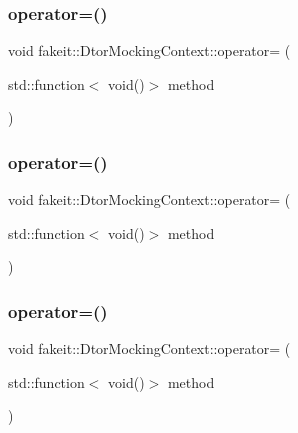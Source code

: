 \subsubsection{\texorpdfstring{operator=()}{operator=()}\hspace{0.1cm}{\footnotesize\ttfamily [3/9]}}
{\footnotesize\ttfamily void fakeit\+::\+Dtor\+Mocking\+Context\+::operator= (\begin{DoxyParamCaption}\item[{std\+::function$<$ void()$>$}]{method }\end{DoxyParamCaption})\hspace{0.3cm}{\ttfamily [inline]}}

\mbox{\label{classfakeit_1_1DtorMockingContext_ac65118e0817e56484fb2238d6c1b3f46}} 
\subsubsection{\texorpdfstring{operator=()}{operator=()}\hspace{0.1cm}{\footnotesize\ttfamily [4/9]}}
{\footnotesize\ttfamily void fakeit\+::\+Dtor\+Mocking\+Context\+::operator= (\begin{DoxyParamCaption}\item[{std\+::function$<$ void()$>$}]{method }\end{DoxyParamCaption})\hspace{0.3cm}{\ttfamily [inline]}}

\mbox{\label{classfakeit_1_1DtorMockingContext_ac65118e0817e56484fb2238d6c1b3f46}} 
\subsubsection{\texorpdfstring{operator=()}{operator=()}\hspace{0.1cm}{\footnotesize\ttfamily [5/9]}}
{\footnotesize\ttfamily void fakeit\+::\+Dtor\+Mocking\+Context\+::operator= (\begin{DoxyParamCaption}\item[{std\+::function$<$ void()$>$}]{method }\end{DoxyParamCaption})\hspace{0.3cm}{\ttfamily [inline]}}

